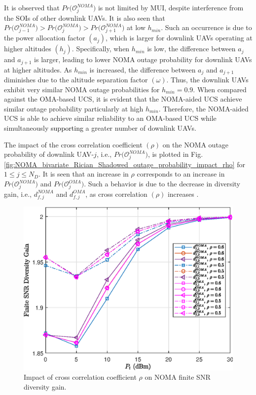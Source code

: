 It is observed that $Pr\big(\mathcal{O}_{j}^{NOMA}\big)$ is not limited by MUI, despite interference from the SOIs of other downlink UAVs. It is also seen that $Pr\big(\mathcal{O}_{j-1}^{NOMA}\big) > Pr\big(\mathcal{O}_{j}^{NOMA}\big) > Pr\big(\mathcal{O}_{j+1}^{NOMA}\big)$ at low $h_{min}$. Such an occurrence is due to the power allocation factor $(a_j)$, which is larger for downlink UAVs operating at higher altitudes $(h_j)$. Specifically, when $h_{min}$ is low, the difference between $a_j$ and $a_{j+1}$ is larger, leading to lower NOMA outage probability for downlink UAVs at higher altitudes. As $h_{min}$ is increased, the difference between $a_j$ and $a_{j+1}$ diminishes due to the altitude separation factor $(\omega)$. Thus, the downlink UAVs exhibit very similar NOMA outage probabilities for $h_{min} = 0.9$. When compared against the OMA-based UCS, it is evident that the NOMA-aided UCS achieve similar outage probability particularly at high $h_{min}$. Therefore, the NOMA-aided UCS is able to achieve similar reliability to an OMA-based UCS while simultaneously \textcolor{black}{supporting} a greater number of downlink UAVs. 

The impact of the cross correlation coefficient $(\rho)$ on the NOMA outage probability of downlink UAV-$j$, i.e., $Pr\big(\mathcal{O}_{j}^{NOMA}\big)$, is plotted in Fig. \ref{fig:NOMA_bivariate_Rician_Shadowed_outage_probability_impact_rho} for $1 \leq j \leq N_D$. It is seen that an increase in $\rho$ corresponds to an increase in $Pr\big(\mathcal{O}_{j}^{NOMA}\big)$ and $Pr\big(\mathcal{O}_{j}^{OMA}\big)$. Such a behavior is due to the decrease in diversity gain, i.e., $d_{f,j}^{NOMA}$ and $d_{f,j}^{OMA}$, as cross correlation $(\rho)$ increases \cite{lopez2018bivariate}. 

\begin{figure} [] 
\centering
\vspace{0.5cm}
\includegraphics [width=0.45\columnwidth]{chap8_fig/finite_snr_diversity_gain_impact_rho.eps} 
\caption{Impact of cross correlation coefficient $\rho$ on NOMA finite SNR diversity gain.}
\label{fig:NOMA_bivariate_Rician_Shadowed_finite_snr_diversity_gain_impact_rho}
\end{figure}

